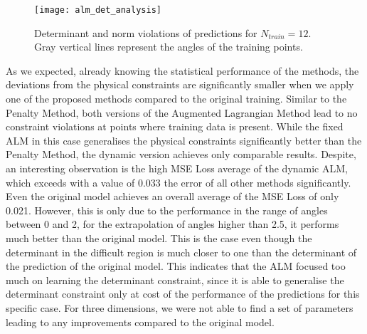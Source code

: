 \begin{figure}[]
	\centering
	\texttt{[image: alm\_det\_analysis]}
	\caption{Determinant and norm violations of predictions for $N_{train} = 12$. Gray vertical lines represent the angles of the training points.}
	\label{fig:alm_det_analysis}
\end{figure}

As we expected, already knowing the statistical performance of the methods, the deviations from the physical constraints are significantly smaller when we apply one of the proposed methods compared to the original training. Similar to the Penalty Method, both versions of the Augmented Lagrangian Method lead to no constraint violations at points where training data is present. While the fixed ALM in this case generalises the physical constraints significantly better than the Penalty Method, the dynamic version achieves only comparable results. Despite, an interesting observation is the high MSE Loss average of the dynamic ALM, which exceeds with a value of 0.033 the error of all other methods significantly. Even the original model achieves an overall average of the MSE Loss of only 0.021. However, this is only due to the performance in the range of angles between 0 and 2, for the extrapolation of angles higher than 2.5, it performs much better than the original model. This is the case even though the determinant in the difficult region is much closer to one than the determinant of the prediction of the original model. This indicates that the ALM focused too much on learning the determinant constraint, since it is able to generalise the determinant constraint only at cost of the performance of the predictions for this specific case. For three dimensions, we were not able to find a set of parameters leading to any improvements compared to the original model.\\

